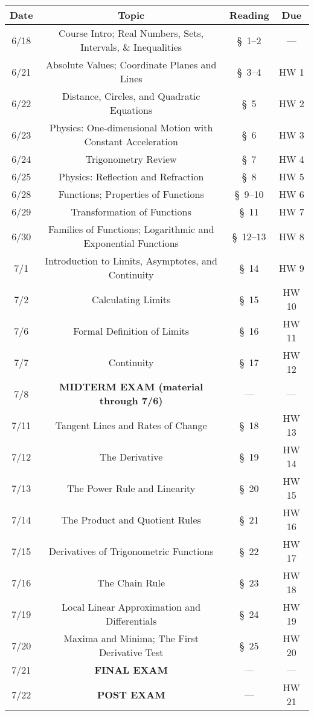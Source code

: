 \documentclass[11pt]{article}
\begin{document}
\begin{center}
\begin{tabular}{|c|c|c|c|}
\hline
\textbf{Date} & \textbf{Topic} & \textbf{Reading} & \textbf{Due} \\
\hline \hline
6/18 & Course Intro; Real Numbers, Sets, Intervals, \& Inequalities & \S~1--2 & --- \\
\hline
6/21 & Absolute Values; Coordinate Planes and Lines & \S~3--4 & HW 1 \\
\hline
6/22 & Distance, Circles, and Quadratic Equations & \S~5 & HW 2 \\
\hline
6/23 & Physics: One-dimensional Motion with Constant Acceleration & \S~6 & HW 3 \\
\hline
6/24 & Trigonometry Review & \S~7 & HW 4 \\
\hline
6/25 & Physics: Reflection and Refraction & \S~8 & HW 5 \\
\hline
6/28 & Functions; Properties of Functions & \S~9--10 & HW 6 \\
\hline
6/29 & Transformation of Functions & \S~11 & HW 7 \\
\hline
6/30 & Families of Functions; Logarithmic and Exponential Functions & \S~12--13 & HW 8 \\
\hline
7/1 & Introduction to Limits, Asymptotes, and Continuity & \S~14 & HW 9 \\
\hline
7/2 & Calculating Limits & \S~15 & HW 10 \\
\hline
7/6 & Formal Definition of Limits & \S~16 & HW 11 \\
\hline
7/7 & Continuity & \S~17 & HW 12 \\
\hline
7/8 & \textbf{MIDTERM EXAM (material through 7/6)} & --- & --- \\
\hline
7/11 & Tangent Lines and Rates of Change & \S~18 & HW 13 \\
\hline
7/12 & The Derivative & \S~19 & HW 14 \\
\hline
7/13 & The Power Rule and Linearity & \S~20 & HW 15 \\
\hline
7/14 & The Product and Quotient Rules & \S~21 & HW 16 \\
\hline
7/15 & Derivatives of Trigonometric Functions & \S~22 & HW 17 \\
\hline
7/16 & The Chain Rule & \S~23 & HW 18 \\
\hline
7/19 & Local Linear Approximation and Differentials & \S~24 & HW 19 \\
\hline
7/20 & Maxima and Minima; The First Derivative Test & \S~25 & HW 20 \\
\hline
7/21 & \textbf{FINAL EXAM} & --- & --- \\
\hline
7/22 & \textbf{POST EXAM} & --- & HW 21 \\
\hline
\end{tabular}
\end{center}
\end{document}
